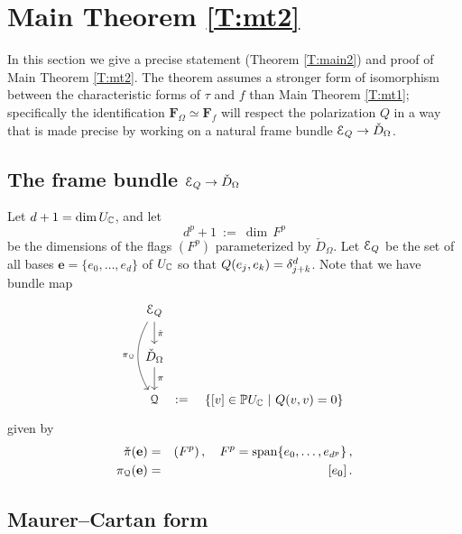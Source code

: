 \documentclass[12pt]{amsart}
\numberwithin{equation}{section}
\numberwithin{table}{section}
\numberwithin{figure}{section}
\begin{document}
\section{Main Theorem \ref{T:mt2}}

In this section we give a precise statement (Theorem \ref{T:main2}) and proof of Main Theorem \ref{T:mt2}.  The theorem assumes a stronger form of isomorphism between the characteristic forms of $\tau$ and $f$ than Main Theorem \ref{T:mt1}; specifically the identification $\mathbf{F}_\Omega \simeq \mathbf{F}_f$ will respect the polarization $Q$ in a way that is made precise by working on a natural frame bundle $\mathcal E_Q \to \check D_\Omega$.

\subsection{The frame bundle $\mathcal E_Q \to \check D_\Omega$}

Let $d+1 = \mathrm{dim}\,U_\mathbb C$, and let 
\[
  d^p + 1 \ := \ \dim\,F^p
\]
be the dimensions of the flags $(F^p)$ parameterized by $\check D_\Omega$.  Let $\mathcal E_Q$ be the set of all bases $\mathbf{e} = \{ e_0 , \ldots , e_d\}$ of $U_\mathbb C$ so that $Q(e_j,e_k) = \delta^{d}_{j+k}$.  Note that we have bundle map
\[
  \begin{tikzcd}
    \cE_Q \arrow[d , -> , "\check\pi"] 
    \arrow[dd , ->, "\pi_\cQ"' , bend right] & \\
    \check D_\Omega \arrow[d , ->,"\pi"] & \\
    \cQ \arrow[r,phantom,":=",description] & 
    \{ [v] \in \bP U_\bC \ | \ Q(v,v) = 0 \}
  \end{tikzcd}
\]
given by
\begin{eqnarray*}
 \check\pi(\mathbf{e}) & = & (F^p) \,,
 \quad F^p = \mathrm{span}\{ e_0 , \ldots , e_{d^p} \} \,, \\
 \pi_\mathcal Q(\mathbf{e}) & = & [e_0] \,.
\end{eqnarray*}

\subsection{Maurer--Cartan form}
\end{document}
